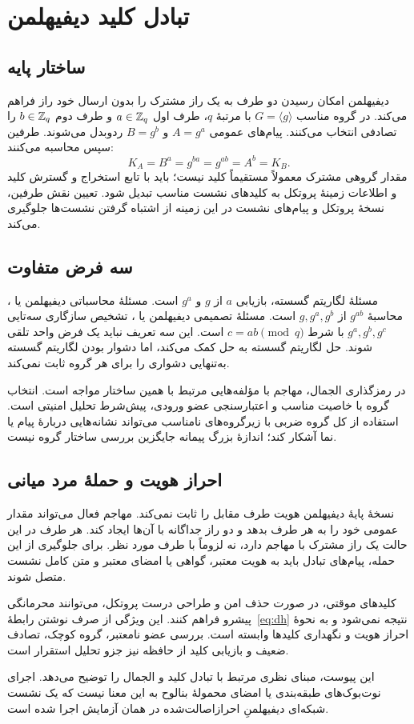 \chapter{تبادل کلید دیفی\lr{--}هلمن}
\label{app:dh}
\section{ساختار پایه}
دیفی\lr{--}هلمن امکان رسیدن دو طرف به یک راز مشترک را بدون ارسال خود راز فراهم می‌کند. در گروه مناسب $G=\langle g\rangle$ با مرتبۀ $q$، طرف اول $a\in\mathbb{Z}_q$ و طرف دوم $b\in\mathbb{Z}_q$ را تصادفی انتخاب می‌کنند. پیام‌های عمومی $A=g^a$ و $B=g^b$ ردوبدل می‌شوند. طرفین سپس محاسبه می‌کنند:
\begin{equation}
K_A=B^a=g^{ba}=g^{ab}=A^b=K_B.
\label{eq:dh}
\end{equation}
مقدار گروهی مشترک معمولاً مستقیماً کلید  نیست؛ باید با تابع استخراج و گسترش کلید و اطلاعات زمینۀ پروتکل به کلیدهای نشست مناسب تبدیل شود. تعیین نقش طرفین، نسخۀ پروتکل و پیام‌های نشست در این زمینه از اشتباه گرفتن نشست‌ها جلوگیری می‌کند.

\section{سه فرض متفاوت}
مسئلۀ لگاریتم گسسته، بازیابی $a$ از $g$ و $g^a$ است. مسئلۀ محاسباتی دیفی\lr{--}هلمن یا ، محاسبۀ $g^{ab}$ از $g,g^a,g^b$ است. مسئلۀ تصمیمی دیفی\lr{--}هلمن یا ، تشخیص سازگاری سه‌تایی $g^a,g^b,g^c$ با شرط $c=ab\pmod q$ است. این سه تعریف نباید یک فرض واحد تلقی شوند. حل لگاریتم گسسته به حل  کمک می‌کند، اما دشوار بودن لگاریتم گسسته به‌تنهایی دشواری  را برای هر گروه ثابت نمی‌کند.

در رمزگذاری الجمال، مهاجم با مؤلفه‌هایی مرتبط با همین ساختار مواجه است. انتخاب گروه با خاصیت مناسب و اعتبارسنجی عضو ورودی، پیش‌شرط تحلیل امنیتی است. استفاده از کل گروه ضربی با زیرگروه‌های نامناسب می‌تواند نشانه‌هایی دربارۀ پیام یا نما آشکار کند؛ اندازۀ بزرگ پیمانه جایگزین بررسی ساختار گروه نیست.

\section{احراز هویت و حملۀ مرد میانی}
نسخۀ پایۀ دیفی\lr{--}هلمن هویت طرف مقابل را ثابت نمی‌کند. مهاجم فعال می‌تواند مقدار عمومی خود را به هر طرف بدهد و دو راز جداگانه با آن‌ها ایجاد کند. هر طرف در این حالت یک راز مشترک با مهاجم دارد، نه لزوماً با طرف مورد نظر. برای جلوگیری از این حمله، پیام‌های تبادل باید به هویت معتبر، گواهی یا امضای معتبر و متن کامل نشست متصل شوند.

کلیدهای موقتی، در صورت حذف امن و طراحی درست پروتکل، می‌توانند محرمانگی پیشرو فراهم کنند. این ویژگی از صرف نوشتن رابطۀ~\eqref{eq:dh} نتیجه نمی‌شود و به نحوۀ احراز هویت و نگهداری کلیدها وابسته است. بررسی عضو نامعتبر، گروه کوچک، تصادف ضعیف و بازیابی کلید از حافظه نیز جزو تحلیل استقرار است.

این پیوست، مبنای نظری مرتبط با تبادل کلید و الجمال را توضیح می‌دهد. اجرای نوت‌بوک‌های طبقه‌بندی یا امضای محمولۀ بنالوح به این معنا نیست که یک نشست شبکه‌ای دیفی\lr{--}هلمنِ احرازاصالت‌شده در همان آزمایش اجرا شده است.
